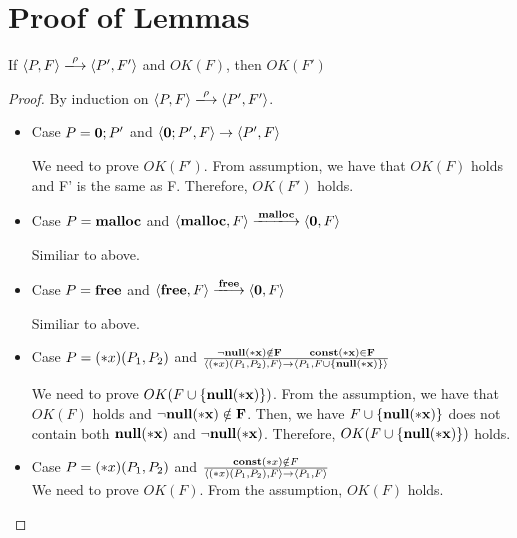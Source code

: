 \section{Proof of Lemmas}
\label{sec:proof}

\begin{lemma}
\label{lem:okFpreserved}
If \( \langle P, F \rangle \xlongrightarrow{\rho} \langle P', F' \rangle\) and \( OK(F)\), then \(OK(F')\)
\end{lemma}

\begin{proof}
By induction on \( \langle P, F \rangle \xlongrightarrow{\rho} \langle P', F' \rangle\).
  \begin{itemize}

  \item Case \( P = {\bf 0};P'\) and \( \langle {\bf 0};P', F \rangle \rightarrow \langle P', F \rangle \)
    
      We need to prove \(OK(F')\). From assumption, we have that
      \(OK(F)\) holds and F' is the same as F. Therefore, \(OK(F')\)
      holds.

    \item Case \( P = \mathbf{malloc}\) and \( \langle \Malloc, F \rangle \xlongrightarrow{\Malloc} \langle {\bf 0}, F \rangle \) 

      Similiar to above.

    \item Case \( P = \mathbf{free}\) and \( \langle \Free, F \rangle \xlongrightarrow{\Free} \langle {\bf 0}, F \rangle \)

      Similiar to above.

    \item Case \( P = (*x)(P_1,P_2)\) and \( \frac{\neg\bf{null}(*x) \notin F
      \quad\quad \mathbf{const}(*x) \in F} { \langle (*x)(P_1, P_2), F \rangle
      \rightarrow \langle P_1, F\cup \{\bf{null}(*x) \} \rangle } \)
      
      We need to prove \( OK(F\cup\{ \bf{null}(*x)\})\). From the assumption,
      we have that \(OK(F)\) holds and \( \neg\bf{null}(*x) \notin F\). Then, we
      have \(F\cup\{ \bf{null}(*x)\}\) does not contain both \(\bf{null}(*x)\) and
      \( \neg\bf{null}(*x)\). Therefore, \( OK(F\cup\{ \bf{null}(*x)\})\) holds.

    \item Case \( P = (*x)(P_1,P_2)\) and \( \frac{\mathbf{const}(*x) \notin F}
      { \langle (*x)(P_1, P_2), F \rangle
      \rightarrow \langle P_1, F \rangle } \) \\
      We need to prove \( OK(F)\). From the assumption, \(OK(F)\) holds.


\end{itemize}
\end{proof}

